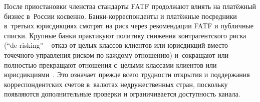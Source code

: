 После приостановки членства стандарты FATF продолжают влиять на
платёжный бизнес в~России косвенно. Банки-корреспонденты и платёжные
посредники в~третьих юрисдикциях смотрят на риск через рекомендации
FATF и публичные списки. Крупные банки практикуют политику снижения
контрагентского риска (\enquote{de-risking} -- отказ от целых классов клиентов или юрисдикций вместо точечного управления риском по каждому отношению) и~сокращают или полностью
прекращают отношения с~целыми классами клиентов или
юрисдикциями~\cite{fatf-correspondent-banking}. Это означает прежде всего трудности открытия и поддержания
корреспондентских счетов в~валютах недружественных стран,
поскольку появляются дополнительные проверки и ограничивается
доступность канала.

